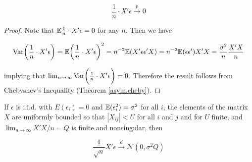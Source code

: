 \begin{lemma} 

\[
\frac{1}{n} \cdot X' \epsilon \xrightarrow{p} 0
\]
\end{lemma}
\begin{proof}Note that \(\mathbb{E} \frac{1}{n} \cdot X' \epsilon = 0\) for any \(n\). Then we have

\[
\mathrm{Var} \bigg( \frac{1}{n} \cdot X' \epsilon \bigg) = \mathbb{E}\bigg( \frac{1}{n} \cdot X' \epsilon \bigg) ^2 = n^{-2} \mathbb{E}(X' \epsilon \epsilon' X)  = n^{-2} \mathbb{E}(\epsilon \epsilon' )X'X = \frac{\sigma^2}{n}  \frac{X'X}{n}
\]

implying that \(\lim_{n \to \infty} \mathrm{Var} \bigg( \frac{1}{n} \cdot X' \epsilon \bigg)=0\). Therefore the result follows from Chebyshev's Inequality (Theorem \ref{asym.cheby}). 
\end{proof}

\begin{lemma}\label{linreg.lemma.2.1} If \(\epsilon\) is i.i.d. with \(E(\epsilon_i) = 0\) and \(\mathbb{E}(\epsilon_i^2) = \sigma^2\) for all \(i\), the elements of the matrix \(X\) are uniformly bounded so that \(|X_{ij}| < U \) for all \(i\) and \(j\) and for \(U\) finite, and \(\lim_{n \to \infty} X'X/n = Q\) is finite and nonsingular, then

\[
\frac{1}{\sqrt{n}} X' \epsilon \xrightarrow{d} \mathcal{N}(0, \sigma^2 Q)
\]
\end{lemma}

